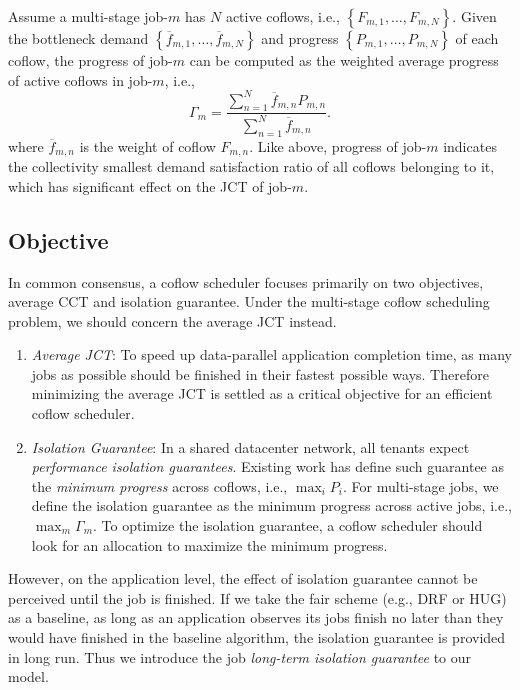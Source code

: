 \documentclass[10pt, conference, letterpaper]{IEEEtran}
\begin{document}
Assume a multi-stage job-$m$ has $N$ active coflows, i.e., $\left\{F_{m,1},\dots,F_{m,N}\right\}$. Given the bottleneck demand $\left\{\overline{f}_{m,1},\dots,\overline{f}_{m,N}\right\}$ and progress $\left\{P_{m,1},\dots,P_{m,N}\right\}$ of each coflow, the progress of job-$m$ can be computed as the weighted average progress of active coflows in job-$m$, i.e.,
\begin{equation}
	\Gamma_m = \frac{\sum_{n=1}^N \overline{f}_{m,n}P_{m,n}}{\sum_{n=1}^N \overline{f}_{m,n}}.
\end{equation}
where $\overline{f}_{m,n}$ is the weight of coflow $F_{m,n}$. Like above, progress of job-$m$ indicates the collectivity smallest demand satisfaction ratio of all coflows belonging to it, which has significant effect on the JCT of job-$m$.

\subsection{Objective}
In common consensus\cite{coflow, coflex, utopia}, a coflow scheduler focuses primarily on two objectives, average CCT and isolation guarantee. Under the multi-stage coflow  scheduling problem, we should concern the average JCT instead.

\begin{enumerate}
	\item \emph{Average JCT}: To speed up data-parallel application completion time, as many jobs as possible should be finished in their fastest possible ways. Therefore minimizing the average JCT is settled as a critical objective for an efficient coflow scheduler.
	\item \emph{Isolation Guarantee}: In a shared datacenter network, all tenants expect \emph{performance isolation guarantees}. Existing work has define such guarantee as the \emph{minimum progress} across coflows\cite{HUG}, i.e., $\max_i P_i$. For multi-stage jobs, we define the isolation guarantee as the minimum progress across active jobs, i.e., $\max_m \Gamma_m$. To optimize the isolation guarantee, a coflow scheduler should look for an allocation to maximize the minimum progress.
\end{enumerate}

However, on the application level, the effect of isolation guarantee cannot be perceived until the job is finished. If we take the fair scheme (e.g., DRF\cite{DRF} or HUG\cite{HUG}) as a baseline, as long as an application observes its jobs finish no later than they would have finished in the baseline algorithm, the isolation guarantee is provided in long run. Thus we introduce the job \emph{long-term isolation guarantee} to our model.
\end{document}
